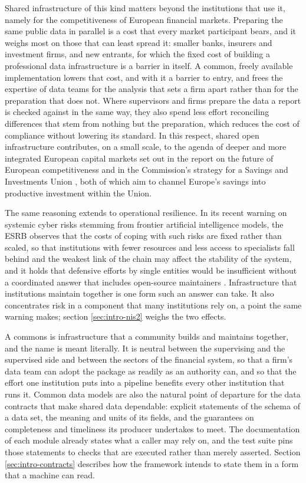 \documentclass[a4paper, 11pt]{report}
\begin{document}
Shared infrastructure of this kind matters beyond the institutions that use it, namely for the competitiveness of European financial markets. Preparing the same public data in parallel is a cost that every market participant bears, and it weighs most on those that can least spread it: smaller banks, insurers and investment firms, and new entrants, for which the fixed cost of building a professional data infrastructure is a barrier in itself. A common, freely available implementation lowers that cost, and with it a barrier to entry, and frees the expertise of data teams for the analysis that sets a firm apart rather than for the preparation that does not. Where supervisors and firms prepare the data a report is checked against in the same way, they also spend less effort reconciling differences that stem from nothing but the preparation, which reduces the cost of compliance without lowering its standard. In this respect, shared open infrastructure contributes, on a small scale, to the agenda of deeper and more integrated European capital markets set out in the report on the future of European competitiveness \parencite{Draghi.2024} and in the Commission's strategy for a Savings and Investments Union \parencite{EuropeanCommission.2025}, both of which aim to channel Europe's savings into productive investment within the Union.

The same reasoning extends to operational resilience. In its recent warning on systemic cyber risks stemming from frontier artificial intelligence models, the ESRB observes that the costs of coping with such risks are fixed rather than scaled, so that institutions with fewer resources and less access to specialists fall behind and the weakest link of the chain may affect the stability of the system, and it holds that defensive efforts by single entities would be insufficient without a coordinated answer that includes open-source maintainers \parencite{ESRB.2026}. Infrastructure that institutions maintain together is one form such an answer can take. It also concentrates risk in a component that many institutions rely on, a point the same warning makes; section \ref{sec:intro-nis2} weighs the two effects.

A commons is infrastructure that a community builds and maintains together, and the name is meant literally. It is neutral between the supervising and the supervised side and between the sectors of the financial system, so that a firm's data team can adopt the package as readily as an authority can, and so that the effort one institution puts into a pipeline benefits every other institution that runs it. Common data models are also the natural point of departure for the data contracts that make shared data dependable: explicit statements of the schema of a data set, the meaning and units of its fields, and the guarantees on completeness and timeliness its producer undertakes to meet. The documentation of each module already states what a caller may rely on, and the test suite pins those statements to checks that are executed rather than merely asserted. Section \ref{sec:intro-contracts} describes how the framework intends to state them in a form that a machine can read.
\end{document}
